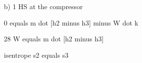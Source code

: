 b) 1 HS at the compressor

0 equals m dot [h2 minus h3] minus W dot k

28 W equals m dot [h2 minus h3]

isentrope
s2 equals s3